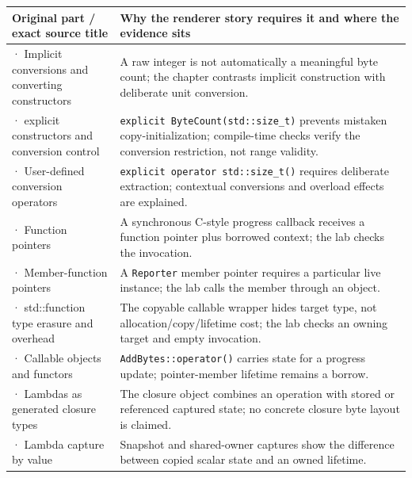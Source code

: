 {\def\LTcaptype{none} %
\begin{longtable}[]{@{}
  >{\raggedright\arraybackslash}p{}
  >{\raggedright\arraybackslash}p{}@{}}
\toprule\noalign{}
\begin{minipage}[b]{\linewidth}\raggedright
Original part / exact source title
\end{minipage} & \begin{minipage}[b]{\linewidth}\raggedright
Why the renderer story requires it and where the evidence sits
\end{minipage} \\
\midrule\noalign{}
\endhead
\bottomrule\noalign{}
\endlastfoot
181 · Implicit conversions and converting constructors & A raw integer is not automatically a meaningful byte count; the chapter contrasts implicit construction with deliberate unit conversion. \\
182 · explicit constructors and conversion control & \texttt{explicit\ ByteCount(std::size\_t)} prevents mistaken copy-initialization; compile-time checks verify the conversion restriction, not range validity. \\
183 · User-defined conversion operators & \texttt{explicit\ operator\ std::size\_t()} requires deliberate extraction; contextual conversions and overload effects are explained. \\
184 · Function pointers & A synchronous C-style progress callback receives a function pointer plus borrowed context; the lab checks the invocation. \\
185 · Member-function pointers & A \texttt{Reporter} member pointer requires a particular live instance; the lab calls the member through an object. \\
186 · std::function type erasure and overhead & The copyable callable wrapper hides target type, not allocation/copy/lifetime cost; the lab checks an owning target and empty invocation. \\
187 · Callable objects and functors & \texttt{AddBytes::operator()} carries state for a progress update; pointer-member lifetime remains a borrow. \\
188 · Lambdas as generated closure types & The closure object combines an operation with stored or referenced captured state; no concrete closure byte layout is claimed. \\
189 · Lambda capture by value & Snapshot and shared-owner captures show the difference between copied scalar state and an owned lifetime. \\

\end{longtable}}
